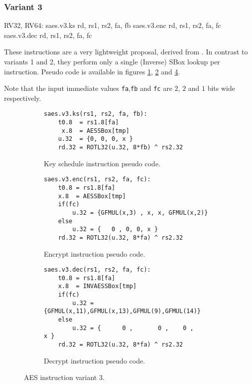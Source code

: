 \subsubsection{Variant 3}

\begin{cryptoisa}
RV32, RV64:
    saes.v3.ks     rd, rs1, rs2, fa, fb    
    saes.v3.enc    rd, rs1, rs2, fa, fc
    saes.v3.dec    rd, rs1, rs2, fa, fc
\end{cryptoisa}

These instructions are a very lightweight proposal, derived from
\cite{MJS:20}.
In contrast to variants 1 and 2, they perform only a single (Inverse) SBox
lookup per instruction.
Pseudo code is available in figures
\ref{fig:pesudo:aes:v3:ks},
\ref{fig:pesudo:aes:v3:enc} and
\ref{fig:pesudo:aes:v3:dec}.

Note that the input immediate values {\tt fa},{\tt fb} and {\tt fc}
are $2$, $2$ and $1$ bits wide respectively.

\begin{figure}

\begin{subfigure}[b]{1.0\textwidth}
\begin{lstlisting}
saes.v3.ks(rs1, rs2, fa, fb):
    t0.8  = rs1.8[fa]
     x.8  = AESSBox[tmp]
    u.32  = {0, 0, 0, x }
    rd.32 = ROTL32(u.32, 8*fb) ^ rs2.32
\end{lstlisting}
\caption{Key schedule instruction pseudo code.}
\label{fig:pesudo:aes:v3:ks}
\end{subfigure}

\begin{subfigure}[b]{1.0\textwidth}
\begin{lstlisting}
saes.v3.enc(rs1, rs2, fa, fc):
    t0.8 = rs1.8[fa]
    x.8  = AESSBox[tmp]
    if(fc)
        u.32 = {GFMUL(x,3) , x, x, GFMUL(x,2)}
    else
        u.32 = {   0 , 0, 0, x }
    rd.32 = ROTL32(u.32, 8*fa) ^ rs2.32
\end{lstlisting}
\caption{Encrypt instruction pseudo code.}
\label{fig:pesudo:aes:v3:enc}
\end{subfigure}

\begin{subfigure}[b]{1.0\textwidth}
\begin{lstlisting}
saes.v3.dec(rs1, rs2, fa, fc):
    t0.8 = rs1.8[fa]
    x.8  = INVAESSBox[tmp]
    if(fc)
        u.32 = {GFMUL(x,11),GFMUL(x,13),GFMUL(9),GFMUL(14)}
    else
        u.32 = {      0 ,       0 ,    0 ,       x }
    rd.32 = ROTL32(u.32, 8*fa) ^ rs2.32
\end{lstlisting}
\caption{Decrypt instruction pseudo code.}
\label{fig:pesudo:aes:v3:dec}
\end{subfigure}
\caption{AES instruction variant 3.}
\end{figure}
